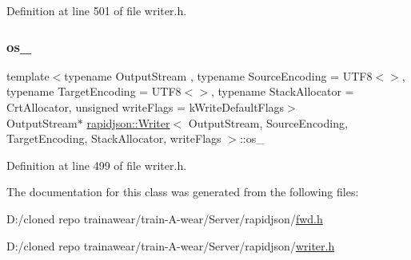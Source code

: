 Definition at line 501 of file writer.\+h.

\mbox{\label{classrapidjson_1_1_writer_a1370d3fd6728d4f0b3f20d734bb27eaf}} 
\subsubsection{\texorpdfstring{os\_}{os\_}}
{\footnotesize\ttfamily template$<$typename Output\+Stream , typename Source\+Encoding  = U\+T\+F8$<$$>$, typename Target\+Encoding  = U\+T\+F8$<$$>$, typename Stack\+Allocator  = Crt\+Allocator, unsigned write\+Flags = k\+Write\+Default\+Flags$>$ \\
Output\+Stream$\ast$ \mbox{\hyperlink{classrapidjson_1_1_writer}{rapidjson\+::\+Writer}}$<$ Output\+Stream, Source\+Encoding, Target\+Encoding, Stack\+Allocator, write\+Flags $>$\+::os\+\_\+\hspace{0.3cm}{\ttfamily [protected]}}



Definition at line 499 of file writer.\+h.



The documentation for this class was generated from the following files\+:\begin{DoxyCompactItemize}
\item 
D\+:/cloned repo trainawear/train-\/\+A-\/wear/\+Server/rapidjson/\mbox{\hyperlink{fwd_8h}{fwd.\+h}}\item 
D\+:/cloned repo trainawear/train-\/\+A-\/wear/\+Server/rapidjson/\mbox{\hyperlink{writer_8h}{writer.\+h}}\end{DoxyCompactItemize}
